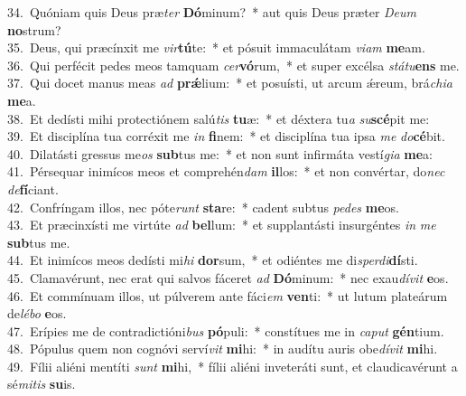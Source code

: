 {34.~}Quóniam quis Deus præ\textit{ter} \textbf{Dó}minum?~* aut quis Deus præter \textit{De}\textit{um} \textbf{no}strum?\\
{35.~}Deus, qui præcínxit me \textit{vir}\textbf{tú}te:~* et pósuit immaculátam \textit{vi}\textit{am} \textbf{me}am.\\
{36.~}Qui perfécit pedes meos tamquam \textit{cer}\textbf{vó}rum,~* et super excélsa \textit{stá}\textit{tu}\textbf{ens} me.\\
{37.~}Qui docet manus meas \textit{ad} \textbf{prǽ}lium:~* et posuísti, ut arcum ǽreum, brá\textit{chi}\textit{a} \textbf{me}a.\\
{38.~}Et dedísti mihi protectiónem salú\textit{tis} \textbf{tu}æ:~* et déxtera tu\textit{a} \textit{su}\textbf{scé}pit me:\\
{39.~}Et disciplína tua corréxit me \textit{in} \textbf{fi}nem:~* et disciplína tua ipsa \textit{me} \textit{do}\textbf{cé}bit.\\
{40.~}Dilatásti gressus me\textit{os} \textbf{sub}tus me:~* et non sunt infirmáta vestí\textit{gi}\textit{a} \textbf{me}a:\\
{41.~}Pérsequar inimícos meos et comprehén\textit{dam} \textbf{il}los:~* et non convértar, do\textit{nec} \textit{de}\textbf{fí}ciant.\\
{42.~}Confríngam illos, nec póte\textit{runt} \textbf{sta}re:~* cadent subtus \textit{pe}\textit{des} \textbf{me}os.\\
{43.~}Et præcinxísti me virtúte \textit{ad} \textbf{bel}lum:~* et supplantásti insurgéntes \textit{in} \textit{me} \textbf{sub}tus me.\\
{44.~}Et inimícos meos dedísti mi\textit{hi} \textbf{dor}sum,~* et odiéntes me di\textit{sper}\textit{di}\textbf{dí}sti.\\
{45.~}Clamavérunt, nec erat qui salvos fáceret \textit{ad} \textbf{Dó}minum:~* nec exau\textit{dí}\textit{vit} \textbf{e}os.\\
{46.~}Et commínuam illos, ut púlverem ante fáci\textit{em} \textbf{ven}ti:~* ut lutum plateárum de\textit{lé}\textit{bo} \textbf{e}os.\\
{47.~}Erípies me de contradictióni\textit{bus} \textbf{pó}puli:~* constítues me in \textit{ca}\textit{put} \textbf{gén}tium.\\
{48.~}Pópulus quem non cognóvi serví\textit{vit} \textbf{mi}hi:~* in audítu auris obe\textit{dí}\textit{vit} \textbf{mi}hi.\\
{49.~}Fílii aliéni mentíti \textit{sunt} \textbf{mi}hi,~* fílii aliéni inveteráti sunt, et claudicavérunt a sé\textit{mi}\textit{tis} \textbf{su}is.\\
